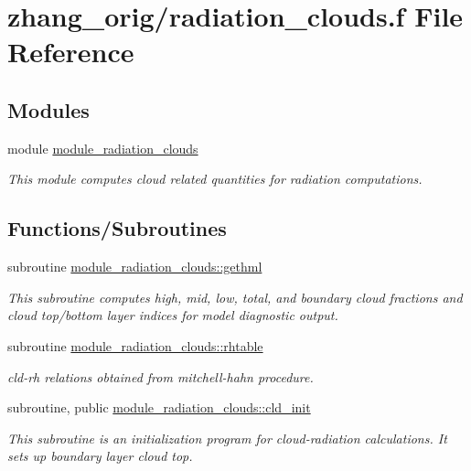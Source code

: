 \hypertarget{zhang__orig_2radiation__clouds_8f}{}\section{zhang\+\_\+orig/radiation\+\_\+clouds.f File Reference}
\label{zhang__orig_2radiation__clouds_8f}
\subsection*{Modules}
\begin{DoxyCompactItemize}
\item 
module \hyperlink{namespacemodule__radiation__clouds}{module\+\_\+radiation\+\_\+clouds}
\begin{DoxyCompactList}\small\item\em This module computes cloud related quantities for radiation computations. \end{DoxyCompactList}\end{DoxyCompactItemize}
\subsection*{Functions/\+Subroutines}
\begin{DoxyCompactItemize}
\item 
subroutine \hyperlink{group__module__radiation__clouds_gade00b72417f507bb7b07bc58dad58a61}{module\+\_\+radiation\+\_\+clouds\+::gethml}
\begin{DoxyCompactList}\small\item\em This subroutine computes high, mid, low, total, and boundary cloud fractions and cloud top/bottom layer indices for model diagnostic output. \end{DoxyCompactList}\item 
subroutine \hyperlink{group__module__radiation__clouds_gaf2368d9f176e9ab76bd9bd7cd687f491}{module\+\_\+radiation\+\_\+clouds\+::rhtable}
\begin{DoxyCompactList}\small\item\em cld-\/rh relations obtained from mitchell-\/hahn procedure. \end{DoxyCompactList}\end{DoxyCompactItemize}
{\bf }\par
\begin{DoxyCompactItemize}
\item 
subroutine, public \hyperlink{group__module__radiation__clouds_gaefedd7070249eb5871275994e3b7dcdd}{module\+\_\+radiation\+\_\+clouds\+::cld\+\_\+init}
\begin{DoxyCompactList}\small\item\em This subroutine is an initialization program for cloud-\/radiation calculations. It sets up boundary layer cloud top. \end{DoxyCompactList}\end{DoxyCompactItemize}


